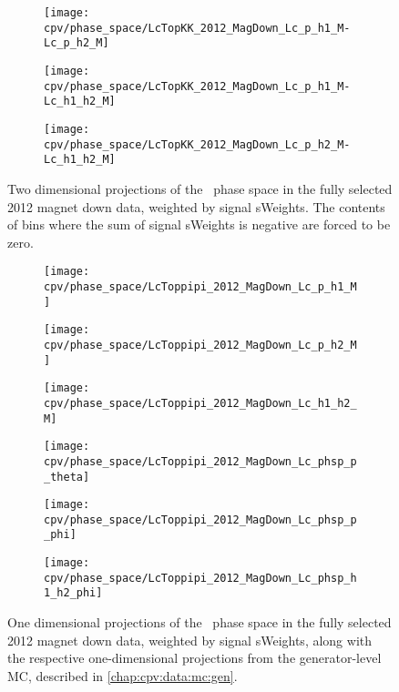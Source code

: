 \begin{figure}
  \begin{subfigure}{0.5\textwidth}
    \texttt{[image: cpv/phase\_space/LcTopKK\_2012\_MagDown\_Lc\_p\_h1\_M-Lc\_p\_h2\_M]}
    \label{fig:cpv:phsp:data:pKK:msqphm_msqphp}
  \end{subfigure}
  \begin{subfigure}{0.5\textwidth}
    \texttt{[image: cpv/phase\_space/LcTopKK\_2012\_MagDown\_Lc\_p\_h1\_M-Lc\_h1\_h2\_M]}
    \label{fig:cpv:phsp:data:pKK:msqphp_msqhh}
  \end{subfigure}
  \begin{subfigure}{0.5\textwidth}
    \texttt{[image: cpv/phase\_space/LcTopKK\_2012\_MagDown\_Lc\_p\_h2\_M-Lc\_h1\_h2\_M]}
    \label{fig:cpv:phsp:data:pKK:msqpp_msqhh}
  \end{subfigure}
  \caption{%
    Two dimensional projections of the \LcTopKK\ phase space in the fully 
    selected 2012 magnet down data, weighted by signal sWeights.
    The contents of bins where the sum of signal sWeights is negative are 
    forced to be zero.
  }
  \label{fig:cpv:phsp:data_2D:pKK}
\end{figure}

\begin{figure}
  \centering
  \begin{subfigure}{0.4\textwidth}
    \texttt{[image: cpv/phase\_space/LcToppipi\_2012\_MagDown\_Lc\_p\_h1\_M]}
    \label{fig:cpv:phsp:data:ppipi:msqphm}
  \end{subfigure}
  \begin{subfigure}{0.4\textwidth}
    \texttt{[image: cpv/phase\_space/LcToppipi\_2012\_MagDown\_Lc\_p\_h2\_M]}
    \label{fig:cpv:phsp:data:ppipi:msqphp}
  \end{subfigure}
  \begin{subfigure}{0.4\textwidth}
    \texttt{[image: cpv/phase\_space/LcToppipi\_2012\_MagDown\_Lc\_h1\_h2\_M]}
    \label{fig:cpv:phsp:data:ppipi:msqhh}
  \end{subfigure}
  \begin{subfigure}{0.4\textwidth}
    \texttt{[image: cpv/phase\_space/LcToppipi\_2012\_MagDown\_Lc\_phsp\_p\_theta]}
    \label{fig:cpv:phsp:data:ppipi:proton_theta}
  \end{subfigure}
  \begin{subfigure}{0.4\textwidth}
    \texttt{[image: cpv/phase\_space/LcToppipi\_2012\_MagDown\_Lc\_phsp\_p\_phi]}
    \label{fig:cpv:phsp:data:ppipi:proton_phi}
  \end{subfigure}
  \begin{subfigure}{0.4\textwidth}
    \texttt{[image: cpv/phase\_space/LcToppipi\_2012\_MagDown\_Lc\_phsp\_h1\_h2\_phi]}
    \label{fig:cpv:phsp:data:ppipi:h1_h2_phi}
  \end{subfigure}
  \caption{%
    One dimensional projections of the \LcToppipi\ phase space in the fully 
    selected 2012 magnet down data, weighted by signal sWeights, along with the 
    respective one-dimensional projections from the generator-level \ac{MC}, 
    described in \cref{chap:cpv:data:mc:gen}.
  }
  \label{fig:cpv:phsp:data_1D:ppipi}
\end{figure}

